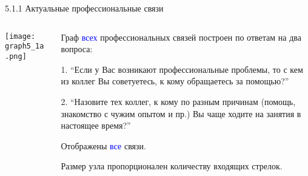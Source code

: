 \begin{frame}{5.1.1 Актуальные профессиональные связи}

\begin{columns} 
\begin{column}{0.75\textwidth} 
\centering
          \texttt{[image: graph5\_1a.png]}
\end{column}
\begin{column}{0.25\textwidth} 

\tiny
Граф \textcolor{blue}{всех} профессиональных связей построен по ответам на два вопроса:
\smallskip

1. ``Если у Вас возникают профессиональные проблемы, то с кем из коллег Вы советуетесь, к кому обращаетесь за помощью?''
\smallskip

2. ``Назовите тех коллег, к кому по разным причинам (помощь, знакомство с чужим опытом и пр.) Вы чаще ходите на занятия в настоящее время?''
\smallskip

Отображены \textcolor{blue}{все} связи. 
\smallskip

Размер узла пропорционален количеству входящих стрелок.

\end{column}
\end{columns}
\end{frame}


